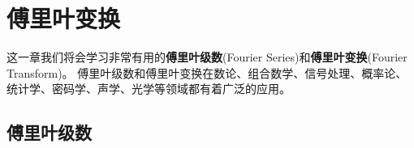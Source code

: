 \chapter{傅里叶变换}
这一章我们将会学习非常有用的\textbf{傅里叶级数}(Fourier Series)和\textbf{傅里叶变换}(Fourier Transform)。
傅里叶级数和傅里叶变换在数论、组合数学、信号处理、概率论、统计学、密码学、声学、光学等领域都有着广泛的应用。


\section{傅里叶级数}
\label{sec:fourier_series}



% 
% 
% 
% 

